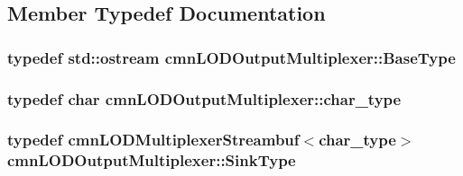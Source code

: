 \subsection{Member Typedef Documentation}
\hypertarget{classcmn_l_o_d_output_multiplexer_a5c02280584b487c3d478b0fee8f829ef}{
\subsubsection[{Base\-Type}]{\setlength{\rightskip}{0pt plus 5cm}typedef std\-::ostream {\bf cmn\-L\-O\-D\-Output\-Multiplexer\-::\-Base\-Type}}}\label{classcmn_l_o_d_output_multiplexer_a5c02280584b487c3d478b0fee8f829ef}
\hypertarget{classcmn_l_o_d_output_multiplexer_a8228345f1af2deaa59cda6f4958c5b3b}{
\subsubsection[{char\-\_\-type}]{\setlength{\rightskip}{0pt plus 5cm}typedef char {\bf cmn\-L\-O\-D\-Output\-Multiplexer\-::char\-\_\-type}}}\label{classcmn_l_o_d_output_multiplexer_a8228345f1af2deaa59cda6f4958c5b3b}
\hypertarget{classcmn_l_o_d_output_multiplexer_a8020e1fe3db5ba7fb371c4554b986d6c}{
\subsubsection[{Sink\-Type}]{\setlength{\rightskip}{0pt plus 5cm}typedef {\bf cmn\-L\-O\-D\-Multiplexer\-Streambuf}$<${\bf char\-\_\-type}$>$ {\bf cmn\-L\-O\-D\-Output\-Multiplexer\-::\-Sink\-Type}}}\label{classcmn_l_o_d_output_multiplexer_a8020e1fe3db5ba7fb371c4554b986d6c}


